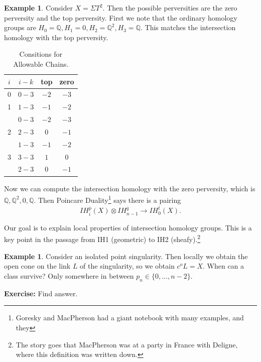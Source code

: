 \documentclass[leqno, openany]{memoir}
\theoremstyle{definition}
\newtheorem{exm}[thm]{Example}
\theoremstyle{remark}
\theoremstyle{plain}
\theoremstyle{definition}
\theoremstyle{remark}
\newcommand{\Q}{\mathbb{Q}}
\begin{document}
\begin{exm}
    Consider $X = \Sigma T^2$. Then the possible perversities are the zero perversity and the top perversity. First we note that the ordinary homology groups are $H_0 = \Q, H_1 = 0, H_2 = \Q^2, H_3 = \Q$. This matches the intersection homology with the top perversity.

    \begin{table}[H]
    \begin{center}
    \begin{tabular}{cccc}
        \toprule
        $i$ & $i-k$ & top  & zero \\
        \midrule
        $0$ & $0-3$ & $-2$ & $-3$ \\
        1   & $1-3$ & $-1$ & $-2$ \\
            & $0-3$ & $-2$ & $-3$ \\
        2   & $2-3$ & $0$  & $-1$ \\
            & $1-3$ & $-1$ & $-2$ \\
        3   & $3-3$ & $1$  & $0$  \\
            & $2-3$ & $0$  & $-1$ \\
        \bottomrule
    \end{tabular}
    \end{center}
    \caption{Consitions for Allowable Chains.}%
    \label{tab:consitions-allowable-chains}
    \end{table}
    Now we can compute the intersection homology with the zero perversity, which is $\Q, \Q^2, 0, \Q$. Then Poincare Duality\footnote{Goresky and MacPherson had a giant notebook with many examples, and they} says there is a pairing
    \[ IH_i^{\overline{p}}(X) \otimes IH_{n-1}^{\overline{q}} \to IH_0^{\overline{t}}(X). \]
\end{exm}

Our goal is to explain local properties of intersection homology groups. This is a key point in the passage from IH1 (geometric) to IH2 (sheafy).\footnote{The story goes that MacPherson was at a party in France with Deligne, where this definition was written down.}

\begin{exm}
    Consider an isolated point singularity. Then locally we obtain the open cone on the link $L$ of the singularity, so we obtain $c^oL = X$. When can a class survive? Only somewhere in between $p_n \in \{0, \ldots, n-2 \}$.

    \textbf{Exercise:} Find answer.
\end{exm}
\end{document}
